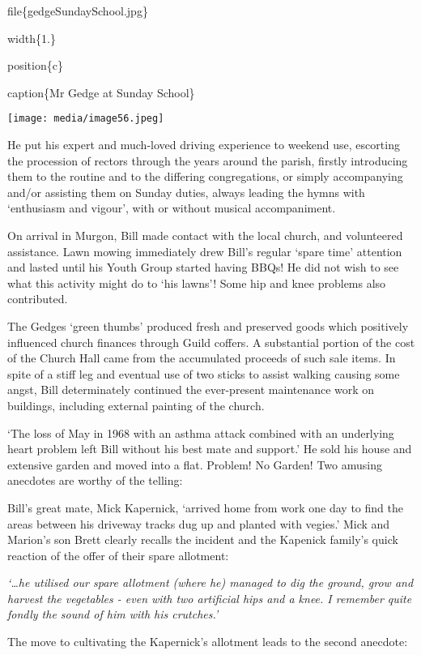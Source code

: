 file\{gedgeSundaySchool.jpg\}

width\{1.\}

position\{c\}

caption\{Mr Gedge at Sunday School\}

\texttt{[image: media/image56.jpeg]}

He put his expert and much-loved driving experience to weekend use, escorting the procession of rectors through the years around the parish, firstly introducing them to the routine and to the differing congregations, or simply accompanying and/or assisting them on Sunday duties, always leading the hymns with `enthusiasm and vigour', with or without musical accompaniment.

On arrival in Murgon, Bill made contact with the local church, and volunteered assistance. Lawn mowing immediately drew Bill's regular `spare time' attention and lasted until his Youth Group started having BBQs! He did not wish to see what this activity might do to `his lawns'! Some hip and knee problems also contributed.

The Gedges `green thumbs' produced fresh and preserved goods which positively influenced church finances through Guild coffers. A substantial portion of the cost of the Church Hall came from the accumulated proceeds of such sale items. In spite of a stiff leg and eventual use of two sticks to assist walking causing some angst, Bill determinately continued the ever-present maintenance work on buildings, including external painting of the church.

`The loss of May in 1968 with an asthma attack combined with an underlying heart problem left Bill without his best mate and support.' He sold his house and extensive garden and moved into a flat. Problem! No Garden! Two amusing anecdotes are worthy of the telling:

Bill's great mate, Mick Kapernick, `arrived home from work one day to find the areas between his driveway tracks dug up and planted with vegies.' Mick and Marion's son Brett clearly recalls the incident and the Kapenick family's quick reaction of the offer of their spare allotment:

\emph{`\ldots he utilised our spare allotment (where he) managed to dig the ground, grow and harvest the vegetables - even with two artificial hips and a knee. I remember quite fondly the sound of him with his crutches.'}

The move to cultivating the Kapernick's allotment leads to the second anecdote:


